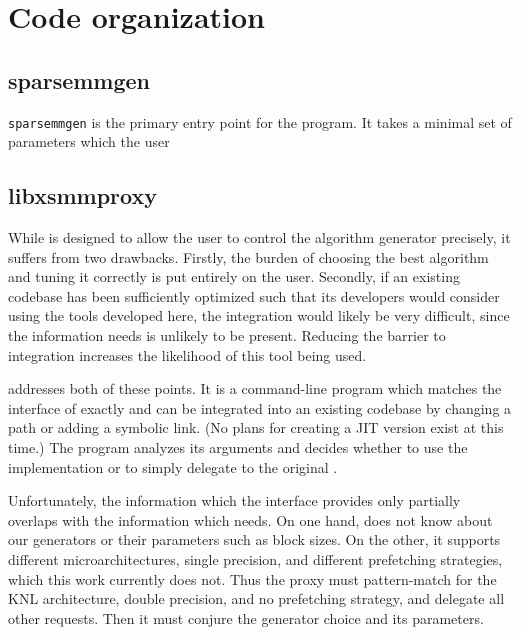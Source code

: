 \section{Code organization}

\subsection{sparsemmgen}

\texttt{sparsemmgen} is the primary entry point for the program. It takes a minimal set of parameters which the user 

\subsection{libxsmmproxy}

While  is designed to allow the user to control the algorithm generator precisely, it suffers from two drawbacks. Firstly, the burden of choosing the best algorithm and tuning it correctly is put entirely on the user. Secondly, if an existing codebase has been sufficiently optimized such that its developers would consider using the tools developed here, the integration would likely be very difficult, since the information  needs is unlikely to be present. Reducing the barrier to integration increases the likelihood of this tool being used.

 addresses both of these points. It is a command-line program which matches the interface of  exactly and can be integrated into an existing codebase by changing a path or adding a symbolic link. (No plans for creating a JIT version exist at this time.) The program analyzes its arguments and decides whether to use the  implementation or to simply delegate to the original .

Unfortunately, the information which the  interface provides only partially overlaps with the information which  needs. On one hand,  does not know about our generators or their parameters such as block sizes. On the other, it supports different microarchitectures, single precision, and different prefetching strategies, which this work currently does not. Thus the proxy must pattern-match for the KNL architecture, double precision, and no prefetching strategy, and delegate all other requests. Then it must conjure the generator choice and its parameters.

